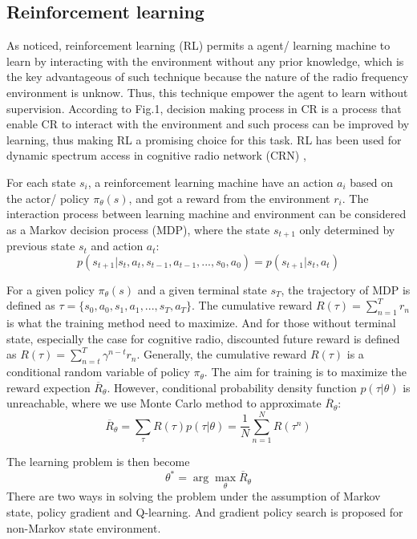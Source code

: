 \documentclass[journal]{IEEEtran}
\begin{document}
\subsection{Reinforcement learning}
As noticed, reinforcement learning (RL) permits a agent/ learning machine to learn by interacting with the environment \cite{sutton1998reinforcement} without any prior knowledge, which is the key advantageous of such technique because the nature of the radio frequency environment is unknow. Thus, this technique empower the agent to learn without supervision. According to Fig.1, decision making process in CR is a process that enable CR to interact with the environment and such process can be improved by learning, thus making RL a promising choice for this task. RL has been used for dynamic spectrum access in cognitive radio network (CRN) \cite{yau2010applications},

For each state $s_i$, a reinforcement learning machine have an action $a_i$ based on the actor/ policy $\pi_\theta (s)$, and got a reward from the environment $r_i$. The interaction process between learning machine and environment can be considered as a Markov decision process (MDP), where the state $s_{t+1}$ only determined by previous state $s_t$ and action $a_t$:
\begin{equation}
  p(s_{t+1}|s_t,a_t,s_{t-1},a_{t-1},...,s_{0},a_0) = p(s_{t+1}|s_t,a_t)
\end{equation}

For a given policy $\pi_\theta (s)$ and a given terminal state $s_T$, the trajectory of MDP is defined as $\tau = \{s_0,a_0,s_1,a_1,...,s_T,a_T\}$. The  cumulative reward $R(\tau)=\sum \limits_{n=1}^T r_n$ is what the training method need to maximize. And for those without terminal state, especially the case for cognitive radio, discounted future reward is defined as $R(\tau)=\sum \limits_{n=t}^T \gamma^{n-t}r_n$. Generally, the  cumulative reward $R(\tau)$ is a conditional random variable of policy $\pi_\theta$. The aim for training is to maximize the reward expection $\overline{R}_\theta$. However, conditional probability density function $p(\tau|\theta)$ is unreachable, where we use Monte Carlo method to approximate $\overline{R}_\theta$:
\begin{equation}
  \overline{R}_\theta = \sum \limits_\tau R(\tau)p(\tau|\theta) = \frac{1}{N}\sum \limits_{n=1}^N  R(\tau^n)
\end{equation}

The learning problem is then become
\begin{equation}
  \theta^* = \arg \max \limits_\theta \overline{R}_\theta
\end{equation}
There are two ways in solving the problem under the assumption of Markov state, policy gradient and Q-learning. And gradient policy search is proposed for non-Markov state environment.



\end{document}
